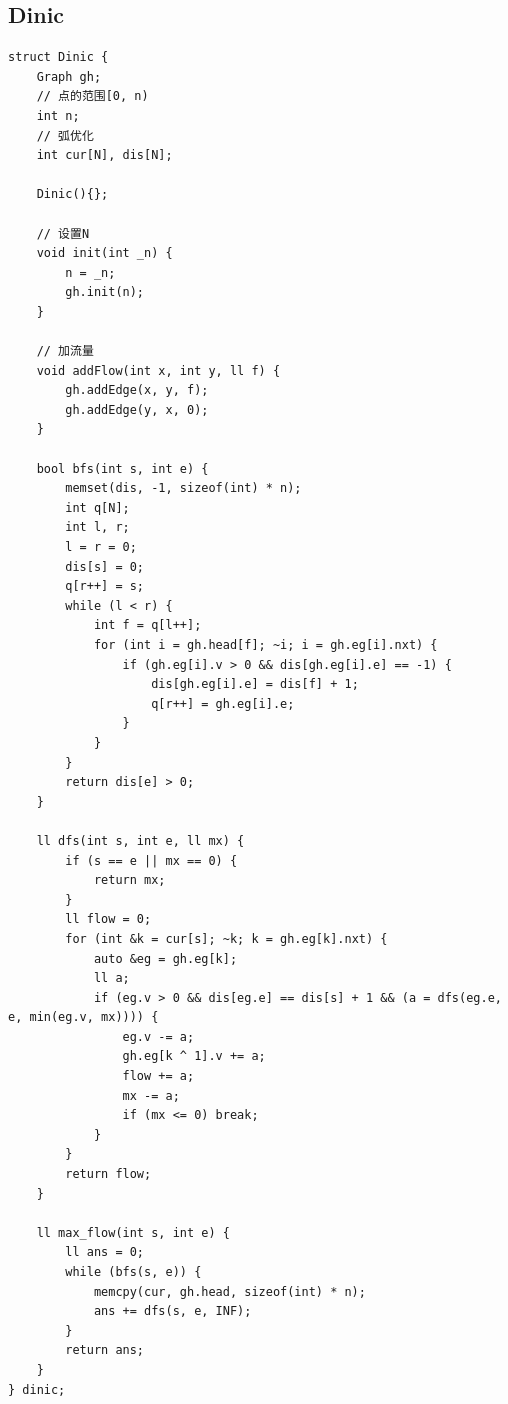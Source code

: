 \documentclass[twoside]{article}
\begin{document}
\subsection{Dinic}
\begin{lstlisting}
struct Dinic {
    Graph gh;
    // 点的范围[0, n)
    int n;
    // 弧优化
    int cur[N], dis[N];

    Dinic(){};

    // 设置N
    void init(int _n) {
        n = _n;
        gh.init(n);
    }

    // 加流量
    void addFlow(int x, int y, ll f) {
        gh.addEdge(x, y, f);
        gh.addEdge(y, x, 0);
    }

    bool bfs(int s, int e) {
        memset(dis, -1, sizeof(int) * n);
        int q[N];
        int l, r;
        l = r = 0;
        dis[s] = 0;
        q[r++] = s;
        while (l < r) {
            int f = q[l++];
            for (int i = gh.head[f]; ~i; i = gh.eg[i].nxt) {
                if (gh.eg[i].v > 0 && dis[gh.eg[i].e] == -1) {
                    dis[gh.eg[i].e] = dis[f] + 1;
                    q[r++] = gh.eg[i].e;
                }
            }
        }
        return dis[e] > 0;
    }

    ll dfs(int s, int e, ll mx) {
        if (s == e || mx == 0) {
            return mx;
        }
        ll flow = 0;
        for (int &k = cur[s]; ~k; k = gh.eg[k].nxt) {
            auto &eg = gh.eg[k];
            ll a;
            if (eg.v > 0 && dis[eg.e] == dis[s] + 1 && (a = dfs(eg.e, e, min(eg.v, mx)))) {
                eg.v -= a;
                gh.eg[k ^ 1].v += a;
                flow += a;
                mx -= a;
                if (mx <= 0) break;
            }
        }
        return flow;
    }

    ll max_flow(int s, int e) {
        ll ans = 0;
        while (bfs(s, e)) {
            memcpy(cur, gh.head, sizeof(int) * n);
            ans += dfs(s, e, INF);
        }
        return ans;
    }
} dinic;\end{lstlisting}
\end{document}
